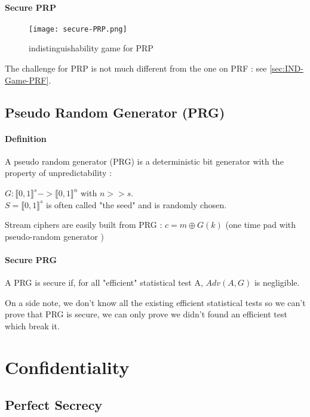\paragraph{Secure PRP \\}


\begin{figure}[ht!]
	\centering
		\texttt{[image: secure-PRP.png]}
	\caption{indistinguishability game for PRP}
	\label{fig:Cipher}
\end{figure}

The challenge for PRP is not much different from the one on PRF : see \ref{sec:IND-Game-PRF}.

\subsection{Pseudo Random Generator     (PRG)} 


\paragraph{Definition \\}

A pseudo random generator (PRG) is a deterministic bit generator with the property of  unpredictability :
\begin{mydef}
$ G : \llbracket  0,1 \rrbracket ^s -> \llbracket  0,1 \rrbracket ^n $  with  $n>>s$. \\ $S = \llbracket  0,1 \rrbracket ^s$ is often called "the seed" and is randomly chosen. 
\end{mydef}

Stream ciphers are easily built from PRG : $c = m \oplus G(k) $  (one time pad with pseudo-random generator )


\paragraph{Secure PRG \\}
A PRG is secure if, for all "efficient" statistical test A, $Adv(A,G)$ is negligible.

On a side note, we don't know all the existing efficient statistical tests so we can't prove that PRG is secure, we can only prove we didn't found an efficient test which break it.


\section{Confidentiality}
\subsection{Perfect Secrecy}

